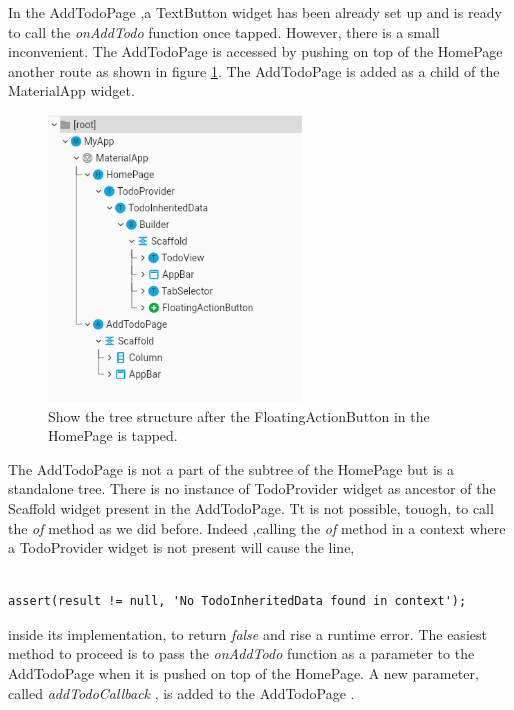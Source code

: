 In the AddTodoPage ,a TextButton widget has been already set up and is ready to call the \textit{onAddTodo }function once tapped. However, there is a small inconvenient. The AddTodoPage is accessed by pushing on top of the HomePage another route as shown in figure \ref{fig:add_todo_page_tree_structure}. The AddTodoPage is added as a child of the MaterialApp widget.

\begin{figure}[H]
    \centering
    \includegraphics[width=0.6\textwidth]{Images/tree_structure_on_AddTodoPage.png}
    \caption{Show the tree structure after the FloatingActionButton in the HomePage is tapped.}
    \label{fig:add_todo_page_tree_structure}
\end{figure}


The AddTodoPage is not a part of the subtree of the HomePage but is a standalone tree. There is no instance of TodoProvider widget as ancestor of the  Scaffold widget present in the AddTodoPage. Tt is not possible, touogh, to call the \textit{of} method as  we did before. Indeed ,calling the \textit{of} method in a context where a TodoProvider widget is not present will cause the line,
\mbox{}\\

\begin{code}
\label{code:2.33}
\begin{verbatim}

assert(result != null, 'No TodoInheritedData found in context');
\end{verbatim}
\end{code}
inside its implementation, to return \textit{false} and rise a runtime error. The easiest method to proceed is to pass the \textit{onAddTodo} function as a parameter to the AddTodoPage when it is pushed on top of the HomePage. A new parameter, called \textit{addTodoCallback }, is added to the AddTodoPage .
\mbox{}\\


